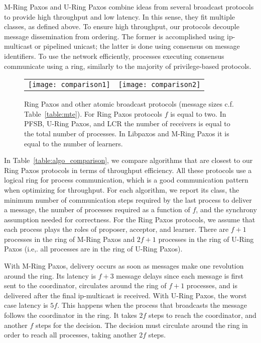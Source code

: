\documentclass[final,3p,times,twocolumn,authoryear]{elsarticle}
\begin{document}
M-Ring Paxos and U-Ring Paxos combine ideas from several broadcast protocols to provide high throughput and low latency. In this sense, they fit multiple classes, as defined above. To ensure high throughput, our protocols decouple message dissemination from ordering. The former is accomplished using ip-multicast or pipelined unicast; the latter is done using consensus on
message identifiers. To use the network efficiently, processes executing consensus communicate using a ring, similarly to the majority of privilege-based protocols. 

\begin{figure*}
  \begin{center}
    \begin{tabular}{c@{}c}
      \texttt{[image: comparison1]} &
      \texttt{[image: comparison2]} \\
    \end{tabular}
    \vspace{-3mm}
    \caption{Ring Paxos and other atomic broadcast protocols (message sizes c.f. Table~\ref{table:mte}). For Ring Paxos protocols $f$ is equal to two. In PFSB, U-Ring Paxos, and LCR the number of receivers is equal to the total number of processes. In Libpaxos and M-Ring Paxos it is equal to the number of learners.}
  \label{fig:others}
  \end{center}
\end{figure*}



In Table~\ref{table:algo_comparison}, we compare algorithms that are closest to our Ring Paxos protocols in terms of throughput efficiency. All these protocols use a logical ring for process communication, which is a good communication pattern when optimizing for throughput. For each algorithm, we report its class, the minimum number of communication steps required by the last process to deliver a message, the number of processes required as a function of $f$, and the synchrony assumption needed for correctness. For the Ring Paxos protocols, we assume that each process plays the roles of proposer, acceptor, and learner. There are $f+1$ processes in the ring of M-Ring Paxos and $2f+1$ processes in the ring of U-Ring Paxos (i.e,. all processes are in the ring of U-Ring Paxos).

With M-Ring Paxos, delivery occurs as soon as messages make one revolution around the ring. Its latency is $f+3$ message delays since each message is first sent to the coordinator, circulates around the ring of $f+1$ processes, and is delivered after the final ip-multicast is received. With U-Ring Paxos, the worst case latency is $5f$. This happens when the process that broadcasts the message follows the coordinator in the ring. It takes $2f$ steps to reach the coordinator, and another $f$ steps for the decision. The decision must circulate around the ring in order to reach all processes, taking another $2f$ steps.
\end{document}
